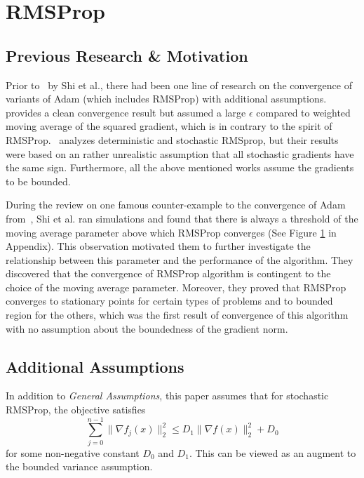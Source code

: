 \documentclass{article}
\begin{document}
\section{RMSProp}
\label{section6}
\setcounter{equation}{0}
\subsection{Previous Research \& Motivation}
Prior to~\cite{shi2021rmsprop} by Shi et al., there had been one line of research on the convergence of variants of Adam (which includes RMSProp) with additional assumptions.~\cite{https://doi.org/10.48550/arxiv.2003.02395} provides a clean convergence result but assumed a large $\epsilon$ compared to  weighted moving average of the squared gradient, which is in contrary to the spirit of RMSProp.~\cite{https://doi.org/10.48550/arxiv.1807.06766} analyzes deterministic and stochastic RMSprop, but their results were based on an rather unrealistic assumption that all stochastic gradients have the same sign. Furthermore, all the above mentioned works assume the gradients to be bounded.

During the review on one famous counter-example to the convergence of Adam from~\cite{https://doi.org/10.48550/arxiv.1904.09237}, Shi et al. ran simulations and found that there is always a threshold of the moving average parameter above which
RMSProp converges (See Figure \hyperref[fig1]{1} in Appendix). This observation motivated them to further investigate the relationship between this parameter and the performance of the algorithm. They discovered that the convergence of RMSProp algorithm is
contingent to the choice of the moving average parameter. Moreover, they proved that RMSProp converges to stationary points for certain types of problems and to bounded region for the others, which was the first result of convergence
of this algorithm with no assumption about the boundedness of the gradient norm.

\subsection{Additional Assumptions}
In addition to \textit{General Assumptions}, this paper assumes that for stochastic RMSProp, the objective satisfies
\begin{equation}
\label{eq51}
\sum_{j = 0}^{n - 1} \|\nabla f_j(x)\|_2^2 \leq D_1 \|\nabla f(x)\|_2^2 + D_0
\end{equation}
for some non-negative constant $D_0$ and $D_1$. This can be viewed as an augment to the bounded variance assumption.
\end{document}
